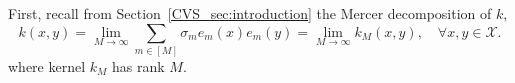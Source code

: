 \documentclass[twoside,11pt]{book}
\numberwithin{theorem}{chapter}
\numberwithin{definition}{chapter}
\numberwithin{proposition}{chapter}
\numberwithin{corollary}{chapter}
\numberwithin{example}{chapter}
\numberwithin{lemma}{chapter}
\numberwithin{assumption}{chapter}
\numberwithin{equation}{chapter}
\numberwithin{figure}{chapter}
\begin{document}
First, recall from Section~\ref{CVS_sec:introduction} the Mercer decomposition of $k$,
\begin{equation}\label{CVS_eq:Mercer_decomposition_1}
k(x,y) = \lim_{M\rightarrow \infty}\sum\limits_{m\in [M]} \sigma_{m} e_{m}(x)e_{m}(y) = \lim_{M\rightarrow \infty} k_M(x,y), \quad\forall x,y\in\mathcal{X}.
\end{equation}
where kernel $k_M$ has rank $M$.
\end{document}
